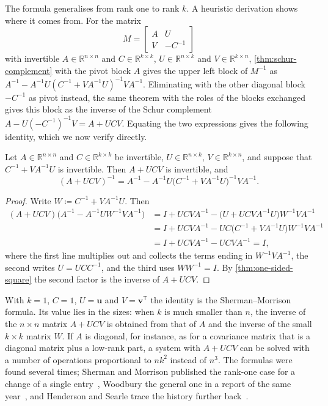 The formula generalises from rank one to rank $k$. A heuristic derivation shows where it comes from. For the matrix
\[
M=\begin{bmatrix}A&U\\V&-C^{-1}\end{bmatrix}
\]
with invertible $A\in\mathbb R^{n\times n}$ and $C\in\mathbb R^{k\times k}$, $U\in\mathbb R^{n\times k}$ and $V\in\mathbb R^{k\times n}$, \cref{thm:schur-complement} with the pivot block $A$ gives the upper left block of $M^{-1}$ as $A^{-1}-A^{-1}U(C^{-1}+VA^{-1}U)^{-1}VA^{-1}$. Eliminating with the other diagonal block $-C^{-1}$ as pivot instead, the same theorem with the roles of the blocks exchanged gives this block as the inverse of the Schur complement $A-U(-C^{-1})^{-1}V=A+UCV$. Equating the two expressions gives the following identity, which we now verify directly.

\begin{theorem}
\label{thm:woodbury}
Let $A\in\mathbb R^{n\times n}$ and $C\in\mathbb R^{k\times k}$ be invertible, $U\in\mathbb R^{n\times k}$, $V\in\mathbb R^{k\times n}$, and suppose that $C^{-1}+VA^{-1}U$ is invertible. Then $A+UCV$ is invertible, and
\[
(A+UCV)^{-1}=A^{-1}-A^{-1}U\bigl(C^{-1}+VA^{-1}U\bigr)^{-1}VA^{-1}.
\]
\end{theorem}

\begin{proof}
Write $W\coloneqq C^{-1}+VA^{-1}U$. Then
\begin{align*}
(A+UCV)\bigl(A^{-1}-A^{-1}UW^{-1}VA^{-1}\bigr)&=I+UCVA^{-1}-\bigl(U+UCVA^{-1}U\bigr)W^{-1}VA^{-1}\\
&=I+UCVA^{-1}-UC\bigl(C^{-1}+VA^{-1}U\bigr)W^{-1}VA^{-1}\\
&=I+UCVA^{-1}-UCVA^{-1}=I,
\end{align*}
where the first line multiplies out and collects the terms ending in $W^{-1}VA^{-1}$, the second writes $U=UCC^{-1}$, and the third uses $WW^{-1}=I$. By \cref{thm:one-sided-square} the second factor is the inverse of $A+UCV$.
\end{proof}

With $k=1$, $C=1$, $U=\mathbf u$ and $V=\mathbf v^{\mathsf T}$ the identity is the Sherman--Morrison formula. Its value lies in the sizes: when $k$ is much smaller than $n$, the inverse of the $n\times n$ matrix $A+UCV$ is obtained from that of $A$ and the inverse of the small $k\times k$ matrix $W$. If $A$ is diagonal, for instance, as for a covariance matrix that is a diagonal matrix plus a low-rank part, a system with $A+UCV$ can be solved with a number of operations proportional to $nk^2$ instead of $n^3$. The formulas were found several times; Sherman and Morrison published the rank-one case for a change of a single entry~\cite{sherman1950}, Woodbury the general one in a report of the same year~\cite{woodbury1950}, and Henderson and Searle trace the history further back~\cite{henderson1981}.

